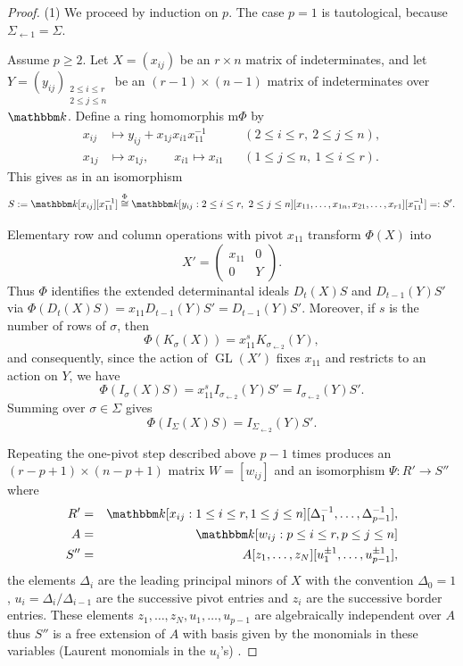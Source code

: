 \documentclass[11pt, reqno]{amsart}
\numberwithin{equation}{section}
\theoremstyle{definition}
\DeclareMathOperator{\GL}{GL}
\newcommand{\kk}{{\mathbbm k}}
\begin{document}
\begin{proof}
(1) We proceed by induction on $p$. The case $p=1$ is tautological, because $\Sigma_{\leftarrow 1}=\Sigma$.

Assume $p\geq2$.
Let $X=(x_{ij})$ be an $r\times n$ matrix of indeterminates, and let
$
Y=(y_{ij})_{\substack{2\leq i\leq r\\2\leq j\leq n}}
$
be an $(r-1)\times(n-1)$ matrix of indeterminates over $\kk$. Define a ring homomorphis m$\Phi$ by
\begin{align*}
x_{ij}&\longmapsto y_{ij}+x_{1j}x_{i1}x_{11}^{-1}
&& (2\leq i\leq r,\ 2\leq j\leq n),\\
x_{1j}&\longmapsto x_{1j},\qquad
x_{i1}\longmapsto x_{i1}
&& (1\leq j\leq n,\ 1\leq i\leq r).
\end{align*}
This gives as in \cite[Lemma 3.4.5]{bruns2022determinants}  an isomorphism
\begin{equation}\label{eq: iso}
S:=\kk[x_{ij}][x_{11}^{-1}]
\overset{\Phi}{\cong}
\kk[y_{ij}:2\leq i\leq r,\ 2\leq j\leq n]
[x_{11},\ldots,x_{1n},x_{21},\ldots,x_{r1}][x_{11}^{-1}]=:S'.
\end{equation}

 Elementary row and column operations with pivot $x_{11}$ transform $\Phi(X)$ into
\[
X'=\begin{pmatrix}x_{11}&0\\0&Y\end{pmatrix}.
\]
Thus $\Phi$ identifies the extended determinantal ideals $D_t(X)S$ and $D_{t-1}(Y)S'$ via $\Phi(D_t(X)S)=x_{11}D_{t-1}(Y)S'=D_{t-1}(Y)S'$.
Moreover, if $s$ is the number of rows of $\sigma$, then
\[
\Phi(K_\sigma(X))=x_{11}^sK_{\sigma_{\leftarrow2}}(Y),
\]
and consequently, since  the action of $\GL(X')$  fixes $x_{11}$ and restricts to an action on $Y$, we have
\begin{equation}\label{eq: iso 2}
\Phi(I_\sigma(X)S)
=x_{11}^sI_{\sigma_{\leftarrow2}}(Y)S'
= I_{\sigma_{\leftarrow2}}(Y)S'.
\end{equation}
Summing over $\sigma\in\Sigma$ gives
\begin{equation}\label{eq: iso 2 Sigma}
\Phi(I_\Sigma(X)S)= I_{\Sigma_{\leftarrow2}}(Y)S'.
\end{equation}

Repeating the one-pivot step described above $p-1$ times produces an $(r-p+1)\times(n-p+1)$ matrix $W=[w_{ij}]$ and an isomorphism $\Psi: R'\to S''$ where
\begin{eqnarray*}
R' &=&\kk[x_{ij}: 1\leq i\leq r, 1\leq j\leq n][\Delta_1^{-1},\ldots,\Delta_{p-1}^{-1}], \\
A &=& \kk[w_{ij} : p\leq i\leq r, p\leq j\leq n]\\
S'' &=& A[z_1, \ldots, z_N] [u_1^{\pm1}, \ldots, u_{p-1}^{\pm1}],
\end{eqnarray*}
the elements $\Delta_i$ are the leading principal minors of $X$ with the convention $\Delta_0=1$,  $u_i=\Delta_i/\Delta_{i-1}$ are the successive pivot entries and $z_i$ are the successive border entries. These elements $z_1, \ldots, z_N, u_1, \ldots, u_{p-1}$ are algebraically independent over $A$ thus $S''$ is a free extension of $A$ with basis given by the monomials in these variables (Laurent monomials in the $u_i$'s) .


\end{proof}
\end{document}
